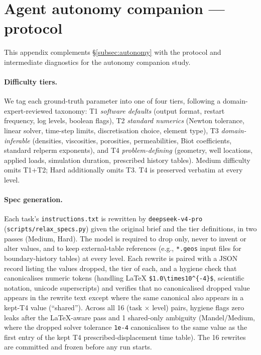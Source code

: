 \documentclass{article}
\begin{document}
\section{Agent autonomy companion --- protocol}
\label{app:autonomy}

This appendix complements \S\ref{subsec:autonomy} with the protocol and intermediate diagnostics for the autonomy companion study.

\paragraph{Difficulty tiers.} We tag each ground-truth parameter into one of four tiers, following a domain-expert-reviewed taxonomy: T1 \emph{software defaults} (output format, restart frequency, log levels, boolean flags), T2 \emph{standard numerics} (Newton tolerance, linear solver, time-step limits, discretisation choice, element type), T3 \emph{domain-inferable} (densities, viscosities, porosities, permeabilities, Biot coefficients, standard relperm exponents), and T4 \emph{problem-defining} (geometry, well locations, applied loads, simulation duration, prescribed history tables). Medium difficulty omits T1+T2; Hard additionally omits T3. T4 is preserved verbatim at every level.

\paragraph{Spec generation.} Each task's \texttt{instructions.txt} is rewritten by \texttt{deepseek-v4-pro} (\texttt{scripts/relax\_specs.py}) given the original brief and the tier definitions, in two passes (Medium, Hard). The model is required to drop only, never to invent or alter values, and to keep external-table references (e.g., \texttt{*.geos} input files for boundary-history tables) at every level. Each rewrite is paired with a JSON record listing the values dropped, the tier of each, and a hygiene check that canonicalises numeric tokens (handling LaTeX \texttt{\$1.0\textbackslash times10\^{}\{-4\}\$}, scientific notation, unicode superscripts) and verifies that no canonicalised dropped value appears in the rewrite text except where the same canonical also appears in a kept-T4 value (``shared''). Across all 16 (task $\times$ level) pairs, hygiene flags zero leaks after the LaTeX-aware pass and 1 shared-only ambiguity (Mandel/Medium, where the dropped solver tolerance \texttt{1e-4} canonicalises to the same value as the first entry of the kept T4 prescribed-displacement time table). The 16 rewrites are committed and frozen before any run starts.
\end{document}
